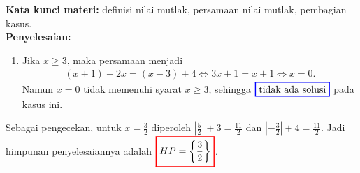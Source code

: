 \documentclass[10pt,openany,a4paper]{article}
\theoremstyle{definition}
\theoremstyle{definition}
\theoremstyle{plain}
\newenvironment{jawab}[2][tes]{%
\par\noindent\textbf{Kata kunci materi:} #1.\\
\textbf{Penyelesaian:} #2%
}{}
\begin{document}
\begin{enumerate}
\begin{jawab}[definisi nilai mutlak, persamaan nilai mutlak, pembagian kasus]
{\begin{enumerate}
\begin{align*}
            \end{align*}
            Karena $-1\leq\frac{3}{2}<3$, maka $\colorlet{oldcolor}{.}
        \color{blue}
        \setlength{\fboxrule}{1pt} \boxed{\color{oldcolor}x=\frac{3}{2}}\color{oldcolor}$ memenuhi.
            \item[(iii)] Jika $x\geq 3$, maka persamaan menjadi
            \begin{align*}
                (x+1)+2x = (x-3)+4 \iff 3x+1 = x+1 \iff x=0.
            \end{align*}
            Namun $x=0$ tidak memenuhi syarat $x\geq 3$, sehingga $\colorlet{oldcolor}{.}
        \color{blue}
        \setlength{\fboxrule}{1pt} \boxed{\color{oldcolor}\text{tidak ada solusi}}\color{oldcolor}$ pada kasus ini.
        \end{enumerate}
        Sebagai pengecekan, untuk $x=\frac{3}{2}$ diperoleh $\left|\frac{5}{2}\right|+3=\frac{11}{2}$ dan $\left|-\frac{3}{2}\right|+4=\frac{11}{2}$. Jadi himpunan penyelesaiannya adalah $\colorlet{oldcolor}{.}
        \color{red}
        \setlength{\fboxrule}{1pt} \boxed{\color{oldcolor}HP=\left\{\frac{3}{2}\right\}}\color{oldcolor}$.
    }
    \end{jawab}


\end{enumerate}
\end{document}
